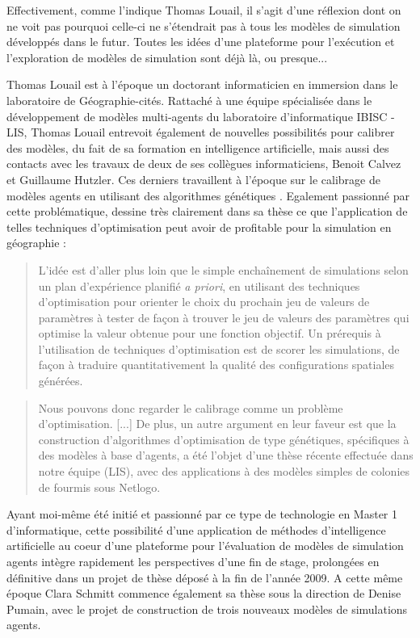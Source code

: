 Effectivement, comme l'indique Thomas Louail, il s'agit d'une réflexion dont on ne voit pas pourquoi celle-ci ne s'étendrait pas à tous les modèles de simulation développés dans le futur. Toutes les idées d'une plateforme pour l'exécution et l'exploration de modèles de simulation sont déjà là, ou presque...

Thomas Louail est à l'époque un doctorant informaticien en immersion dans le laboratoire de Géographie-cités. Rattaché à une équipe spécialisée dans le développement de modèles multi-agents du laboratoire d'informatique IBISC - LIS, Thomas Louail entrevoit également de nouvelles possibilités pour calibrer des modèles, du fait de sa formation en intelligence artificielle, mais aussi des contacts avec les travaux de deux de ses collègues informaticiens, Benoit Calvez et Guillaume Hutzler. Ces derniers travaillent à l'époque sur le calibrage de modèles agents en utilisant des algorithmes génétiques \autocites{Calvez2006a,Calvez2007}. Egalement passionné par cette problématique, \textcite[139-141]{Louail2010} dessine très clairement dans sa thèse ce que l'application de telles techniques d'optimisation peut avoir de profitable pour la simulation en géographie :

\blockquote[{\cite[139-141]{Louail2010}}]{L’idée est d’aller plus loin que le simple enchaînement de simulations selon un plan d’expérience planifié \textit{a priori}, en utilisant des techniques d’optimisation pour orienter le choix du prochain jeu de valeurs de paramètres à tester de façon à trouver le jeu de valeurs des paramètres qui optimise la valeur obtenue pour une fonction objectif. Un prérequis à l’utilisation de techniques d’optimisation est de scorer les simulations, de façon à traduire quantitativement la qualité des configurations spatiales générées.}

\blockquote[{\cite[139-141]{Louail2010}}]{Nous pouvons donc regarder le calibrage comme un problème d’optimisation. [...] De plus, un autre argument en leur faveur est que la construction d’algorithmes d’optimisation de type génétiques, spécifiques à des modèles à base d’agents, a été l’objet d’une thèse récente effectuée dans notre équipe (LIS), avec des applications à des modèles simples de colonies de fourmis sous Netlogo.}

Ayant moi-même été initié et passionné par ce type de technologie en Master 1 d'informatique, cette possibilité d'une application de méthodes d'intelligence artificielle au coeur d'une plateforme pour l'évaluation de modèles de simulation agents intègre rapidement les perspectives d'une fin de stage, prolongées en définitive dans un projet de thèse déposé à la fin de l'année 2009. A cette même époque Clara Schmitt commence également sa thèse sous la direction de Denise Pumain, avec le projet de construction de trois nouveaux modèles de simulations agents.


